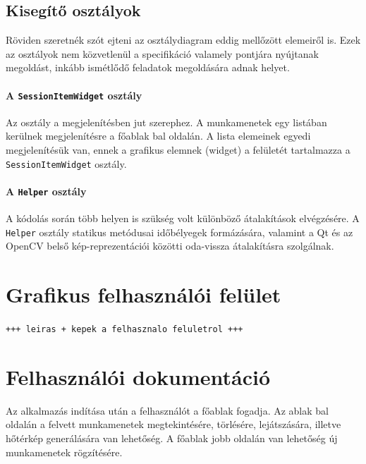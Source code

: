 \subsection{Kisegítő osztályok}\label{sect:helper}

Röviden szeretnék szót ejteni az osztálydiagram eddig mellőzött elemeiről is. Ezek az osztályok nem közvetlenül a specifikáció valamely pontjára nyújtanak megoldást, inkább ismétlődő feladatok megoldására adnak helyet.

\paragraph{A \texttt{SessionItemWidget} osztály}

Az osztály a megjelenítésben jut szerephez. A munkamenetek egy listában kerülnek megjelenítésre a főablak bal oldalán. A lista elemeinek egyedi megjelenítésük van, ennek a grafikus elemnek (widget) a felületét tartalmazza a \texttt{SessionItemWidget} osztály.

\paragraph{A \texttt{Helper} osztály}

A kódolás során több helyen is szükség volt különböző átalakítások elvégzésére. A \texttt{Helper} osztály statikus metódusai időbélyegek formázására, valamint a Qt és az OpenCV belső kép-reprezentációi közötti oda-vissza átalakításra szolgálnak.

\section{Grafikus felhasználói felület}\label{sect:gui}

\texttt{+++ leiras + kepek a felhasznalo feluletrol +++}

\section{Felhasználói dokumentáció}\label{sect:docs}

Az alkalmazás indítása után a felhasználót a főablak fogadja. Az ablak bal oldalán a felvett munkamenetek megtekintésére, törlésére, lejátszására, illetve hőtérkép generálására van lehetőség. A főablak jobb oldalán van lehetőség új munkamenetek rögzítésére.

